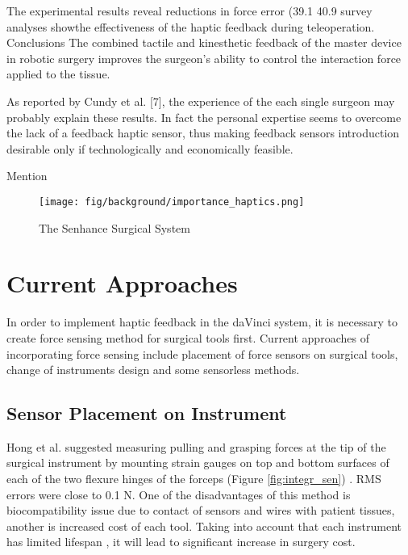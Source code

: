 The experimental results reveal reductions in force error (39.1%
40.9%
survey analyses showthe effectiveness of the haptic feedback during teleoperation.
Conclusions The combined tactile and kinesthetic feedback of the master
device in robotic surgery improves the surgeon’s ability to control the interaction
force applied to the tissue. \cite{lim_role_2015}

As reported by Cundy et al. [7], the experience of the each
single surgeon may probably explain these results. In fact
the personal expertise seems to overcome the lack of a
feedback haptic sensor, thus making feedback sensors
introduction desirable only if technologically and economically
feasible.

Mention 


\begin{figure}[h]
	\begin{center}
	\texttt{[image: fig/background/importance\_haptics.png]}
	\end{center}
	\vspace{-4mm}
	\caption[The Senhance Surgical System]
	{The Senhance Surgical System}
	\label{fig:Senhance}
	\vspace{-2mm}
\end{figure}

\section{Current Approaches}
\label{sec:CurAppr}

In order to implement haptic feedback in the daVinci system, it is necessary to create force sensing method for surgical tools first. Current approaches of incorporating force sensing include placement of force sensors on surgical tools, change of instruments design and some sensorless methods.

\subsection{Sensor Placement on Instrument}

Hong et al. suggested measuring pulling and grasping forces at the tip of the surgical instrument by mounting strain gauges on top and bottom surfaces of each of the two flexure hinges of the forceps (Figure \ref{fig:integr_sen}) \cite{hong_design_2012}. RMS errors were close to 0.1 N. One of the disadvantages of this method is biocompatibility issue due to contact of sensors and wires with patient tissues, another is increased cost of each tool. Taking into account that each instrument has limited lifespan \cite{ho_health_2011}, it will lead to significant increase in surgery cost.


